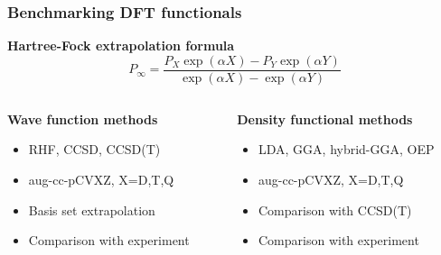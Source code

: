 \begin{frame}
\frametitle{Benchmarking DFT functionals}

\vspace{13mm}

\centering
\textbf{Hartree-Fock extrapolation formula}
\begin{equation}
    \nonumber
    P_\infty = 
    \frac{P_X \exp{(\alpha X)} - P_Y \exp{(\alpha Y)}}
    {\exp{(\alpha X)} - \exp{(\alpha Y)}}
\end{equation}

\vspace{19mm}

\begin{columns}
\begin{column}[b]{0.5\textwidth}
    \textbf{Wave function methods}
    \begin{itemize}
        \item   RHF, CCSD, CCSD(T)
        \item   aug-cc-pCVXZ, X=D,T,Q
        \item   Basis set extrapolation
        \item   Comparison with experiment
    \end{itemize}
\end{column}
\begin{column}[b]{0.5\textwidth}
    \textbf{Density functional methods}
    \begin{itemize}
        \item   LDA, GGA, hybrid-GGA, OEP
        \item   aug-cc-pCVXZ, X=D,T,Q
        \item   Comparison with CCSD(T)
        \item   Comparison with experiment
    \end{itemize}
\end{column}
\end{columns}
\end{frame}

